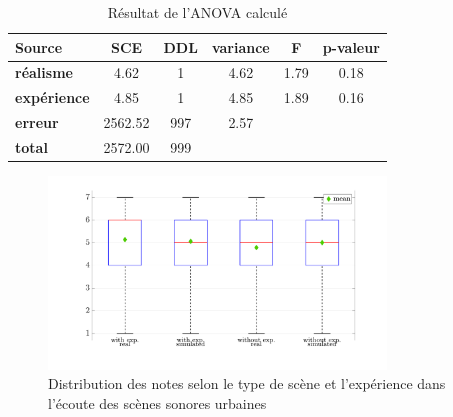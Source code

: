 \begin{table}[ht]
\centering
\begin{tabular}{lccccc}
\hline
\textbf{Source}     & \textbf{SCE} & \textbf{DDL} & \textbf{variance} & \textbf{F} & \textbf{p-valeur} \\
\hline
\textbf{réalisme} & 4.62         & 1            & 4.62              & 1.79       & 0.18              \\
\hline
\textbf{expérience}    & 4.85         & 1            & 4.85              & 1.89       & 0.16              \\
\hline
\textbf{erreur}      & 2562.52      & 997          & 2.57              &            &                   \\
\hline
\textbf{total}      & 2572.00         & 999          &                   &            &       \\
\hline
\end{tabular}
\caption{Résultat de l'ANOVA calculé}
\label{tab:anova_exp}
\end{table}

\begin{figure}[h]
\centering
\includegraphics[width = 0.8\textwidth]{./figures/test_perceptif/testPerceptif_boxplotExperience_EN.pdf}
\caption{Distribution des notes selon le type de scène et l'expérience dans l'écoute des scènes sonores urbaines}\label{fig:ANOVA_exp}
\end{figure}



